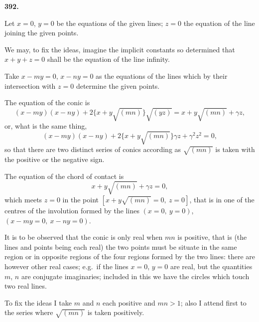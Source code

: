 \documentclass[11pt,a4paper]{article}
\theoremstyle{plain}
\begin{document}
\setcounter{equation}{0}

\textbf{392.}

Let $x = 0$, $y = 0$ be the equations of the given lines; $z = 0$ the equation of the line joining the given points.

We may, to fix the ideas, imagine the implicit constants so determined that $x + y + z = 0$ shall be the equation of the line infinity.

Take $x - my = 0$, $x - ny = 0$ as the equations of the lines which by their intersection with $z = 0$ determine the given points.

The equation of the conic is
\begin{equation}
(x-my)(x-ny) + 2\{x + y\sqrt{(mn)}\}\sqrt{(yz)} = x + y\sqrt{(mn)} + \gamma z,
\end{equation}
or, what is the same thing,
\begin{equation}
(x-my)(x-ny) + 2\{x + y\sqrt{(mn)}\}\gamma z + \gamma^2 z^2 = 0,
\end{equation}
so that there are two distinct series of conics according as $\sqrt{(mn)}$ is taken with the positive or the negative sign.

The equation of the chord of contact is
\begin{equation}
x + y\sqrt{(mn)} + \gamma z = 0,
\end{equation}
which meets $z = 0$ in the point $[x + y\sqrt{(mn)} = 0,\ z = 0]$, that is in one of the centres of the involution formed by the lines $(x = 0,\ y = 0)$, $(x - my = 0,\ x - ny = 0)$.

It is to be observed that the conic is only real when $mn$ is positive, that is (the lines and points being each real) the two points must be situate in the same region or in opposite regions of the four regions formed by the two lines: there are however other real cases; e.g.~if the lines $x = 0$, $y = 0$ are real, but the quantities $m$, $n$ are conjugate imaginaries; included in this we have the circles which touch two real lines.

\newpage
\setcounter{equation}{3}

To fix the ideas I take $m$ and $n$ each positive and $mn > 1$; also I attend first to the series where $\sqrt{(mn)}$ is taken positively.
\end{document}
